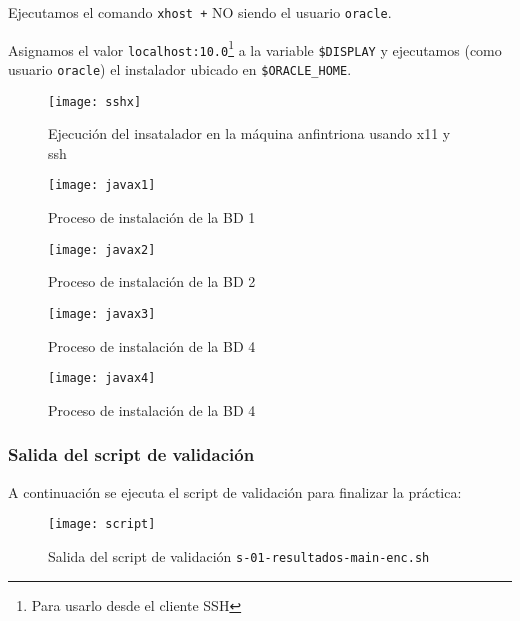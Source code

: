 \documentclass[./main.tex]{subfiles}
\begin{document}
Ejecutamos el comando \texttt{xhost +} NO siendo el usuario \texttt{oracle}.

Asignamos el valor \texttt{localhost:10.0}\footnote{Para usarlo desde el cliente SSH} a la variable \texttt{\$DISPLAY} y ejecutamos (como usuario \texttt{oracle})
el instalador ubicado en \texttt{\$ORACLE_HOME}.
\begin{figure}[H]
  \centering
  \texttt{[image: sshx]}
  \caption{Ejecución del insatalador en la máquina anfintriona usando x11 y ssh}\label{fig:sshx}
\end{figure}

\begin{figure}[H]
  \centering
  \texttt{[image: javax1]}
  \caption{Proceso de instalación de la BD 1}\label{fig:javax1}
\end{figure}

\begin{figure}[H]
  \centering
  \texttt{[image: javax2]}
  \caption{Proceso de instalación de la BD 2}\label{fig:javax2}
\end{figure}

\begin{figure}[H]
  \centering
  \texttt{[image: javax3]}
  \caption{Proceso de instalación de la BD 4}\label{fig:javax3}
\end{figure}

\begin{figure}[H]
  \centering
  \texttt{[image: javax4]}
  \caption{Proceso de instalación de la BD 4}\label{fig:javax4}
\end{figure}

\setcounter{subsubsection}{2}
\subsubsection{Salida del script de validación}\label{sec:salida-del-script2}
A continuación se ejecuta el script de validación para finalizar la práctica:
\begin{figure}[H]
  \centering
  \texttt{[image: script]}
  \caption{Salida del script de validación \texttt{s-01-resultados-main-enc.sh}}\label{fig:script}
\end{figure}
\end{document}
